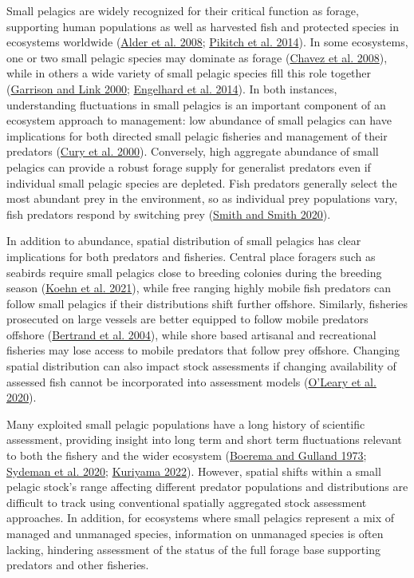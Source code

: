 \documentclass[
]{article}
\begin{document}
Small pelagics are widely recognized for their critical function as forage, supporting human populations as well as harvested fish and protected species in ecosystems worldwide (\protect\hyperlink{ref-alder_forage_2008}{Alder et al. 2008}; \protect\hyperlink{ref-pikitch_global_2014}{Pikitch et al. 2014}). In some ecosystems, one or two small pelagic species may dominate as forage (\protect\hyperlink{ref-chavez_northern_2008}{Chavez et al. 2008}), while in others a wide variety of small pelagic species fill this role together (\protect\hyperlink{ref-garrison_dietary_2000}{Garrison and Link 2000}; \protect\hyperlink{ref-engelhard_forage_2014}{Engelhard et al. 2014}). In both instances, understanding fluctuations in small pelagics is an important component of an ecosystem approach to management: low abundance of small pelagics can have implications for both directed small pelagic fisheries and management of their predators (\protect\hyperlink{ref-cury_small_2000}{Cury et al. 2000}). Conversely, high aggregate abundance of small pelagics can provide a robust forage supply for generalist predators even if individual small pelagic species are depleted. Fish predators generally select the most abundant prey in the environment, so as individual prey populations vary, fish predators respond by switching prey (\protect\hyperlink{ref-smith_multispecies_2020}{Smith and Smith 2020}).

In addition to abundance, spatial distribution of small pelagics has clear implications for both predators and fisheries. Central place foragers such as seabirds require small pelagics close to breeding colonies during the breeding season (\protect\hyperlink{ref-koehn_structured_2021}{Koehn et al. 2021}), while free ranging highly mobile fish predators can follow small pelagics if their distributions shift further offshore. Similarly, fisheries prosecuted on large vessels are better equipped to follow mobile predators offshore (\protect\hyperlink{ref-bertrand_interactions_2004}{Bertrand et al. 2004}), while shore based artisanal and recreational fisheries may lose access to mobile predators that follow prey offshore. Changing spatial distribution can also impact stock assessments if changing availability of assessed fish cannot be incorporated into assessment models (\protect\hyperlink{ref-oleary_adapting_2020}{O'Leary et al. 2020}).

Many exploited small pelagic populations have a long history of scientific assessment, providing insight into long term and short term fluctuations relevant to both the fishery and the wider ecosystem (\protect\hyperlink{ref-boerema_stock_1973}{Boerema and Gulland 1973}; \protect\hyperlink{ref-sydeman_sixty-five_2020}{Sydeman et al. 2020}; \protect\hyperlink{ref-kuriyama_assessment_2022}{Kuriyama 2022}). However, spatial shifts within a small pelagic stock's range affecting different predator populations and distributions are difficult to track using conventional spatially aggregated stock assessment approaches. In addition, for ecosystems where small pelagics represent a mix of managed and unmanaged species, information on unmanaged species is often lacking, hindering assessment of the status of the full forage base supporting predators and other fisheries.
\end{document}
